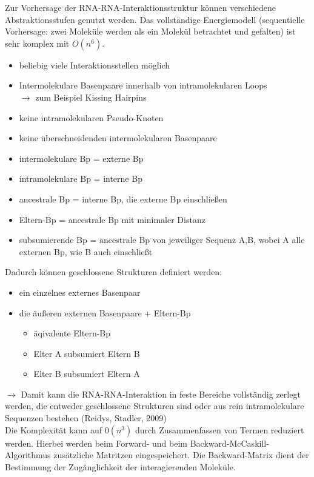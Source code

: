 Zur Vorhersage der RNA-RNA-Interaktionsstruktur können verschiedene Abstraktionsstufen genutzt werden. Das vollständige Energiemodell (sequentielle Vorhersage: zwei Moleküle werden als ein Molekül betrachtet und gefalten) ist sehr komplex mit $O(n^6)$.
\begin{itemize}
\item beliebig viele Interaktionsstellen möglich
\item Intermolekulare Basenpaare innerhalb von intramolekularen Loops \\ $\rightarrow$ zum Beispiel Kissing Hairpins 
\item keine intramolekularen Pseudo-Knoten
\item keine überschneidenden intermolekularen Basenpaare \\
\item intermolekulare Bp = externe Bp
\item intramolekulare Bp = interne Bp
\item ancestrale Bp = interne Bp, die externe Bp einschließen
\item Eltern-Bp = ancestrale Bp mit minimaler Distanz
\item subsumierende Bp = ancestrale Bp von jeweiliger Sequenz A,B, wobei A alle externen Bp, wie B auch einschließt
\end{itemize}

Dadurch können geschlossene Strukturen definiert werden:
\begin{itemize}
\item ein einzelnes externes Basenpaar
\item die äußeren externen Basenpaare + Eltern-Bp 
\begin{itemize}
\item äqivalente Eltern-Bp
\item Elter A subsumiert Eltern B
\item Elter B subsumiert Eltern A
\end{itemize}
\end{itemize}
$\rightarrow$ Damit kann die RNA-RNA-Interaktion in feste Bereiche vollständig zerlegt werden, die entweder geschlossene Strukturen sind oder aus rein intramolekulare Sequenzen bestehen (Reidys, Stadler, 2009) \\

Die Komplexität kann auf $0(n^3)$ durch Zusammenfassen von Termen reduziert werden. Hierbei werden beim Forward- und beim Backward-McCaskill-Algorithmus zusätzliche Matritzen eingespeichert. Die Backward-Matrix dient der Bestimmung der Zugänglichkeit der interagierenden Moleküle.
